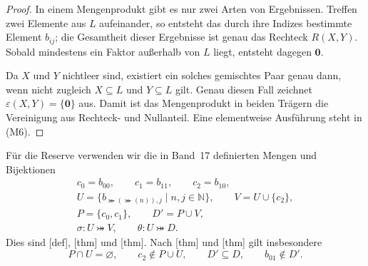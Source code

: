 \documentclass[main.tex]{subfiles}
\begin{document}
\begin{proof}
In einem Mengenprodukt gibt es nur zwei Arten von Ergebnissen. Treffen zwei
Elemente aus \(L\) aufeinander, so entsteht das durch ihre Indizes bestimmte
Element \(b_{ij}\); die Gesamtheit dieser Ergebnisse ist genau das Rechteck
\(R(X,Y)\). Sobald mindestens ein Faktor außerhalb von \(L\) liegt, entsteht
dagegen \(\mathbf0\).

Da \(X\) und \(Y\) nichtleer sind, existiert ein solches gemischtes Paar
genau dann, wenn nicht zugleich \(X\subseteq L\) und \(Y\subseteq L\) gilt.
Genau diesen Fall zeichnet \(\varepsilon(X,Y)=\{\mathbf0\}\) aus. Damit ist
das Mengenprodukt in beiden Trägern die Vereinigung aus Rechteck- und
Nullanteil. Eine elementweise Ausführung steht in \textup{(M6)}.
\end{proof}

\MogTableProofHeading
\begin{tabproofwide}
\end{tabproofwide}

Für die Reserve verwenden wir die in Band~17 definierten Mengen und
Bijektionen
\[
  \begin{gathered}
    c_0=b_{00},\qquad c_1=b_{11},\qquad c_2=b_{10},\\
    U=\{b_{\Succ(\Succ(n)),j}\mid n,j\in\mathbb N\},\qquad
    V=U\cup\{c_2\},\\
    P=\{c_0,c_1\},\qquad D'=P\cup V,\\
    \sigma\colon U\bij V,\qquad
    \theta\colon U\bij D.
  \end{gathered}
\]
Dies sind [def],
[thm] und
[thm]. Nach
[thm] und
[thm] gilt insbesondere
\[
  P\cap U=\varnothing,\qquad
  c_2\notin P\cup U,\qquad
  D'\subseteq D,\qquad
  b_{01}\notin D'.
\]
\end{document}
